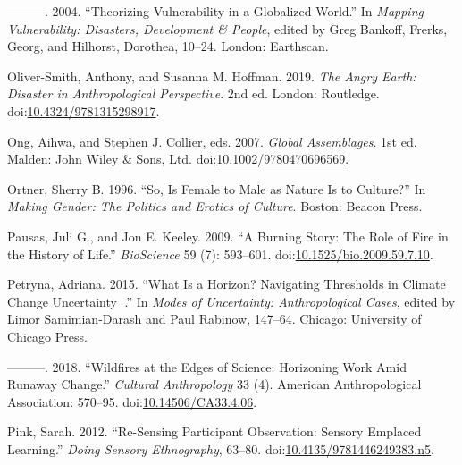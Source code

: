 \documentclass[
]{article}
\newlength{\cslhangindent}
\newenvironment{CSLReferences}[2] %
 {\begin{list}{}{%
  \setlength{\itemindent}{0pt}
  \setlength{\leftmargin}{0pt}
  \setlength{\parsep}{0pt}
  \ifodd #1
   \setlength{\leftmargin}{\cslhangindent}
   \setlength{\itemindent}{-1\cslhangindent}
  \fi
  \setlength{\itemsep}{#2\baselineskip}}}
 {\end{list}}
\begin{document}
\begin{CSLReferences}{1}{0}
---------. 2004. {``Theorizing {Vulnerability} in a {Globalized World}.''} In \emph{Mapping {Vulnerability}: {Disasters}, {Development} \& {People}}, edited by Greg Bankoff, Frerks, Georg, and Hilhorst, Dorothea, 10--24. London: Earthscan.

Oliver-Smith, Anthony, and Susanna M. Hoffman. 2019. \emph{The {Angry Earth}: {Disaster} in {Anthropological Perspective}}. 2nd ed. London: Routledge. doi:\href{https://doi.org/10.4324/9781315298917}{10.4324/9781315298917}.

Ong, Aihwa, and Stephen J. Collier, eds. 2007. \emph{Global {Assemblages}}. 1st ed. Malden: John Wiley \& Sons, Ltd. doi:\href{https://doi.org/10.1002/9780470696569}{10.1002/9780470696569}.

Ortner, Sherry B. 1996. {``So, {Is Female} to {Male} as {Nature Is} to {Culture}?''} In \emph{Making {Gender}: {The Politics} and {Erotics} of {Culture}}. Boston: Beacon Press.

Pausas, Juli G., and Jon E. Keeley. 2009. {``A {Burning Story}: {The Role} of {Fire} in the {History} of {Life}.''} \emph{BioScience} 59 (7): 593--601. doi:\href{https://doi.org/10.1525/bio.2009.59.7.10}{10.1525/bio.2009.59.7.10}.

Petryna, Adriana. 2015. {``What Is a {Horizon}? {Navigating Thresholds} in {Climate Change Uncertainty} .''} In \emph{Modes of {Uncertainty}: {Anthropological Cases}}, edited by Limor Samimian-Darash and Paul Rabinow, 147--64. Chicago: University of Chicago Press.

---------. 2018. {``Wildfires at the {Edges} of {Science}: {Horizoning Work} Amid {Runaway Change}.''} \emph{Cultural Anthropology} 33 (4). American Anthropological Association: 570--95. doi:\href{https://doi.org/10.14506/CA33.4.06}{10.14506/CA33.4.06}.

Pink, Sarah. 2012. {``Re-{Sensing Participant Observation}: {Sensory Emplaced Learning}.''} \emph{Doing Sensory Ethnography}, 63--80. doi:\href{https://doi.org/10.4135/9781446249383.n5}{10.4135/9781446249383.n5}.


\end{CSLReferences}
\end{document}
